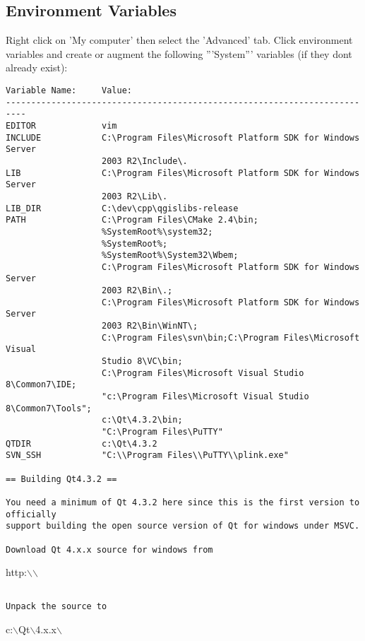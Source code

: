 \subsection{Environment Variables}
Right click on 'My computer' then select the 'Advanced' tab. Click environment variables and 
create or augment the following '''System''' variables (if they dont already exist):

\begin{verbatim}
Variable Name:     Value:
--------------------------------------------------------------------------
EDITOR             vim
INCLUDE            C:\Program Files\Microsoft Platform SDK for Windows Server 
                   2003 R2\Include\.
LIB                C:\Program Files\Microsoft Platform SDK for Windows Server 
                   2003 R2\Lib\.
LIB_DIR            C:\dev\cpp\qgislibs-release
PATH               C:\Program Files\CMake 2.4\bin;
                   %SystemRoot%\system32;
                   %SystemRoot%;
                   %SystemRoot%\System32\Wbem;
                   C:\Program Files\Microsoft Platform SDK for Windows Server 
                   2003 R2\Bin\.;
                   C:\Program Files\Microsoft Platform SDK for Windows Server 
                   2003 R2\Bin\WinNT\;
                   C:\Program Files\svn\bin;C:\Program Files\Microsoft Visual 
                   Studio 8\VC\bin;
                   C:\Program Files\Microsoft Visual Studio 8\Common7\IDE;
                   "c:\Program Files\Microsoft Visual Studio 8\Common7\Tools";
                   c:\Qt\4.3.2\bin;
                   "C:\Program Files\PuTTY"
QTDIR              c:\Qt\4.3.2
SVN_SSH            "C:\\Program Files\\PuTTY\\plink.exe"

== Building Qt4.3.2 ==

You need a minimum of Qt 4.3.2 here since this is the first version to officially 
support building the open source version of Qt for windows under MSVC.

Download Qt 4.x.x source for windows from

\end{verbatim}
http:$\backslash$$\backslash$

\begin{verbatim}

Unpack the source to 

\end{verbatim}
c:$\backslash$Qt$\backslash$4.x.x$\backslash$


